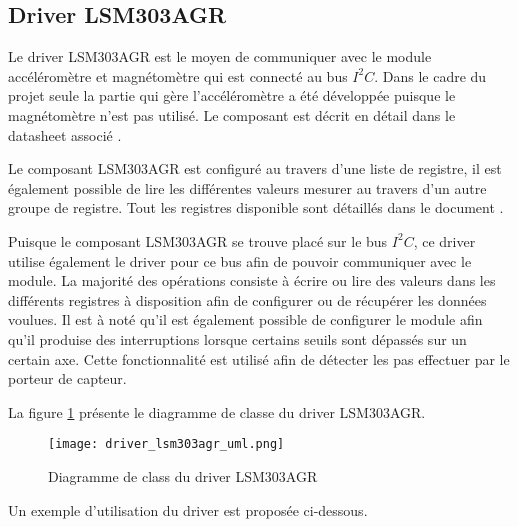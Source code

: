 \subsection{Driver LSM303AGR}

Le driver LSM303AGR est le moyen de communiquer avec le module accéléromètre et magnétomètre qui est connecté au bus $I^{2}C$. Dans le cadre du projet seule la partie qui gère l'accéléromètre a été développée puisque le magnétomètre n'est pas utilisé. Le composant est décrit en détail dans le datasheet associé \cite{lsm303agr-datasheet}.

Le composant LSM303AGR est configuré au travers d'une liste de registre, il est également possible de lire les différentes valeurs mesurer au travers d'un autre groupe de registre. Tout les registres disponible sont détaillés dans le document \cite[p.~43]{lsm303agr-datasheet}.

Puisque le composant LSM303AGR se trouve placé sur le bus $I^{2}C$, ce driver utilise également le driver pour ce bus afin de pouvoir communiquer avec le module. La majorité des opérations consiste à écrire ou lire des valeurs dans les différents registres à disposition afin de configurer ou de récupérer les données voulues. Il est à noté qu'il est également possible de configurer le module afin qu'il produise des interruptions lorsque certains seuils sont dépassés sur un certain axe. Cette fonctionnalité est utilisé afin de détecter les pas effectuer par le porteur de capteur.

La figure \ref{fig:driver_lsm303agr_uml} présente le diagramme de classe du driver LSM303AGR.

\begin{figure}[htb]
\centering 
\texttt{[image: driver\_lsm303agr\_uml.png]} 
\caption{Diagramme de class du driver LSM303AGR}
\label{fig:driver_lsm303agr_uml}
\end{figure}

Un exemple d'utilisation du driver est proposée ci-dessous.

